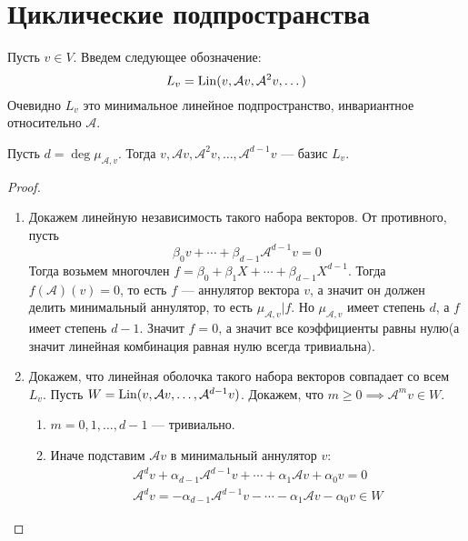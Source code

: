 \documentclass[../main.tex]{subfiles}
\begin{document}
\section{Циклические подпространства}
Пусть $v \in V$. Введем следующее обозначение:
\begin{equation*}
  L_v = \operatorname{Lin}(v, \mathcal{A}v, \mathcal{A}^2v, \dotsc)
\end{equation*}
Очевидно $L_v$ это минимальное линейное подпространство, инвариантное относительно $\mathcal{A}$.
\begin{theorem-non}
\label{non:7.15}
  Пусть $d = \deg \mu_{\mathcal{A}, v}$. Тогда $v, \mathcal{A}v, \mathcal{A}^2v, \dotsc, \mathcal{A}^{d - 1}v$ --- базис $L_v$.
\end{theorem-non}
\begin{proof}
  \begin{enumerate}
    \item Докажем линейную независимость такого набора векторов. От противного, пусть
    \begin{equation*}
      \beta_0 v + \dotsb + \beta_{d - 1} \mathcal{A}^{d - 1} v = 0
    \end{equation*}
    Тогда возьмем многочлен $f = \beta_0 + \beta_1 X + \dotsb + \beta_{d - 1} X^{d - 1}$. Тогда $f(\mathcal{A})(v) = 0$, то есть $f$ --- аннулятор вектора $v$, а значит он должен делить минимальный аннулятор, то есть $\mu_{\mathcal{A}, v} |  f$. Но $\mu_{\mathcal{A}, v}$ имеет степень $d$, а $f$ имеет степень $d - 1$. Значит $f = 0$, а значит все коэффициенты равны нулю(а значит линейная комбинация равная нулю всегда тривиальна).
    \item Докажем, что линейная оболочка такого набора векторов совпадает со всем $L_v$. Пусть $W = \operatorname{Lin}(v, \mathcal{A}v, \dotsc, \mathcal{A}^{d - 1}v)$. Докажем, что $m \geq 0 \implies \mathcal{A}^m v \in W$.
    \begin{enumerate}[1)]
      \item $m = 0, 1,\dotsc, d - 1$ --- тривиально.
      \item Иначе подставим $\mathcal{A}v$ в минимальный аннулятор $v$:
      \begin{equation*}
        \begin{gathered}
          \mathcal{A}^{d}v + \alpha_{d - 1}\mathcal{A}^{d - 1}v + \dotsb + \alpha_1 \mathcal{A}v + \alpha_0 v = 0 \\
          \mathcal{A}^{d}v = -\alpha_{d - 1} \mathcal{A}^{d - 1} v - \dotsb - \alpha_1 \mathcal{A}v - \alpha_0 v \in W
        \end{gathered}

\end{equation*}
\end{enumerate}
\end{enumerate}
\end{proof}
\end{document}
